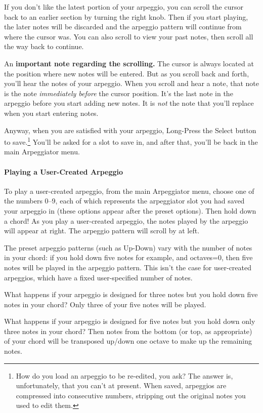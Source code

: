 \documentclass{article}
\begin{document}
If you don't like the latest portion of your arpeggio, you can scroll the cursor back to an earlier section by turning the right knob.  Then if you start playing, the later notes will be discarded and the arpeggio pattern will continue from where the cursor was.  You can also scroll to view your past notes, then scroll all the way back to continue.

An {\bf important note regarding the scrolling.}  The cursor is always located at the position where new notes will be entered.  But as you scroll back and forth, you'll hear the notes of your arpeggio.  When you scroll and hear a note, that note is the note {\it immediately before} the cursor position.  It's the last note in the arpeggio before you start adding new notes. It is {\it not} the note that you'll replace when you start entering notes. 

Anyway, when you are satisfied with your arpeggio, Long-Press the Select button to save.\footnote{How do you load an arpeggio to be re-edited, you ask?  The answer is, unfortunately, that you can't at present.  When saved, arpeggios are compressed into consecutive numbers, stripping out the original notes you used to edit them.}  You'll be asked for a slot to save in, and after that, you'll be back in the main Arpeggiator menu.

\paragraph{Playing a User-Created Arpeggio}

To play a user-created arpeggio, from the main Arpeggiator menu, choose one of the numbers 0--9, each of which represents the arpeggiator slot you had saved your arpeggio in (these options appear after the preset options).  Then hold down a chord!  As you play a user-created arpeggio, the notes played by the arpeggio will appear at right.  The arpeggio pattern will scroll by at left.


The preset arpeggio patterns (such as Up-Down) vary with the number of notes in your chord: if you hold down five notes for example, and octaves=0, then five notes will be played in the arpeggio pattern.  This isn't the case for user-created arpeggios, which have a fixed user-specified number of notes.

What happens if your arpeggio is designed for three notes but you hold down  five notes in your chord?  Only three of your five notes will be played.

What happens if your arpeggio is designed for five notes but you hold down only three notes in your chord?  Then notes from the bottom (or top, as appropriate) of your chord will be transposed up/down one octave to make up the remaining notes.
\end{document}
